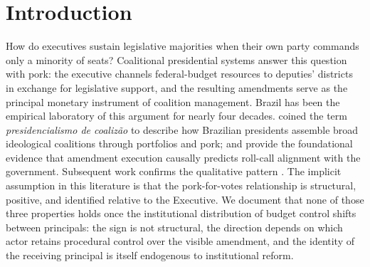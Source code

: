 \documentclass[pdflatex,sn-basic]{sn-jnl}
\begin{document}


\maketitle


\section{Introduction}
\label{sec:intro}

How do executives sustain legislative majorities when their own party commands only a minority of seats? Coalitional presidential systems answer this question with pork: the executive channels federal-budget resources to deputies' districts in exchange for legislative support, and the resulting amendments serve as the principal monetary instrument of coalition management. Brazil has been the empirical laboratory of this argument for nearly four decades. \citet{Abranches1988} coined the term \emph{presidencialismo de coaliz\~ao} to describe how Brazilian presidents assemble broad ideological coalitions through portfolios and pork; \citet{PereiraAndMueller2004} and \citet{Raile2011} provide the foundational evidence that amendment execution causally predicts roll-call alignment with the government. Subsequent work confirms the qualitative pattern \citep{Zucco2009,Power2010,FigueiredoLimongi2000}. The implicit assumption in this literature is that the pork-for-votes relationship is structural, positive, and identified relative to the Executive. We document that none of those three properties holds once the institutional distribution of budget control shifts between principals: the sign is not structural, the direction depends on which actor retains procedural control over the visible amendment, and the identity of the receiving principal is itself endogenous to institutional reform.
\end{document}
